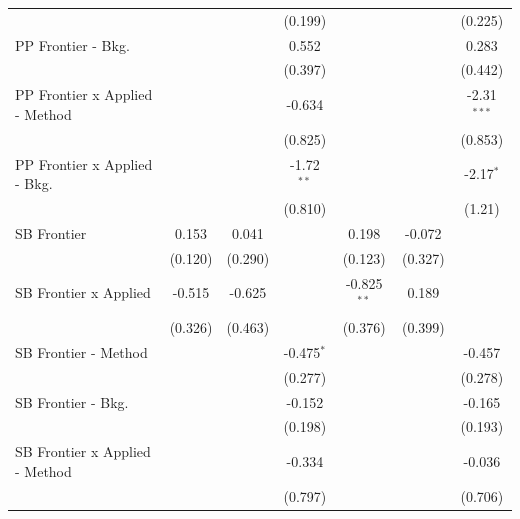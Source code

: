 \begin{tabular}{lcccccc}
                                  &             &         & (0.199)      &               &               & (0.225)\\   
   PP Frontier - Bkg.             &             &         & 0.552        &               &               & 0.283\\   
                                  &             &         & (0.397)      &               &               & (0.442)\\   
   PP Frontier x Applied - Method &             &         & -0.634       &               &               & -2.31$^{***}$\\   
                                  &             &         & (0.825)      &               &               & (0.853)\\   
   PP Frontier x Applied - Bkg.   &             &         & -1.72$^{**}$ &               &               & -2.17$^{*}$\\   
                                  &             &         & (0.810)      &               &               & (1.21)\\   
   SB Frontier                    & 0.153       & 0.041   &              & 0.198         & -0.072        &   \\   
                                  & (0.120)     & (0.290) &              & (0.123)       & (0.327)       &   \\   
   SB Frontier x Applied          & -0.515      & -0.625  &              & -0.825$^{**}$ & 0.189         &   \\   
                                  & (0.326)     & (0.463) &              & (0.376)       & (0.399)       &   \\   
   SB Frontier - Method           &             &         & -0.475$^{*}$ &               &               & -0.457\\   
                                  &             &         & (0.277)      &               &               & (0.278)\\   
   SB Frontier - Bkg.             &             &         & -0.152       &               &               & -0.165\\   
                                  &             &         & (0.198)      &               &               & (0.193)\\   
   SB Frontier x Applied - Method &             &         & -0.334       &               &               & -0.036\\   
                                  &             &         & (0.797)      &               &               & (0.706)\\   

\end{tabular}
